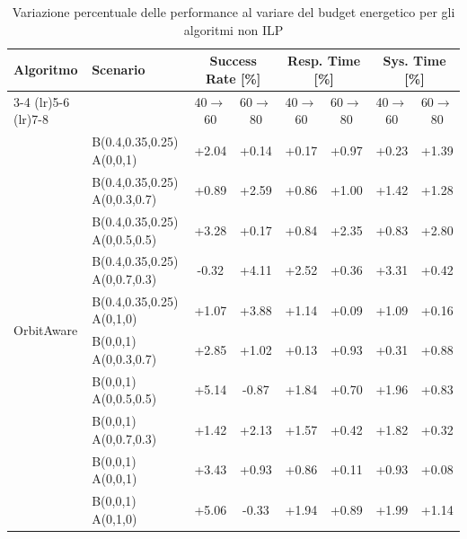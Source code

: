 \documentclass[12pt]{article}
\begin{document}
\begin{table}[h]
\centering
\caption{Variazione percentuale delle performance al variare del budget energetico per gli algoritmi non ILP}
\label{tab:all_algorithms_variation}
\scriptsize
\begin{tabular}{llcccccc}
\toprule
\textbf{Algoritmo} & \textbf{Scenario} 
& \multicolumn{2}{c}{\textbf{Success Rate [\%]}} 
& \multicolumn{2}{c}{\textbf{Resp. Time [\%]}} 
& \multicolumn{2}{c}{\textbf{Sys. Time [\%]}} \\
\cmidrule(lr){3-4} \cmidrule(lr){5-6} \cmidrule(lr){7-8}
& & 40$\rightarrow$60 & 60$\rightarrow$80 
& 40$\rightarrow$60 & 60$\rightarrow$80 
& 40$\rightarrow$60 & 60$\rightarrow$80 \\
\midrule

\multirow{10}{*}{OrbitAware}
& B(0.4,0.35,0.25) A(0,0,1)     & +2.04 & +0.14 & +0.17 & +0.97 & +0.23 & +1.39 \\
& B(0.4,0.35,0.25) A(0,0.3,0.7) & +0.89 & +2.59 & +0.86 & +1.00 & +1.42 & +1.28 \\
& B(0.4,0.35,0.25) A(0,0.5,0.5) & +3.28 & +0.17 & +0.84 & +2.35 & +0.83 & +2.80 \\
& B(0.4,0.35,0.25) A(0,0.7,0.3) & -0.32 & +4.11 & +2.52 & +0.36 & +3.31 & +0.42 \\
& B(0.4,0.35,0.25) A(0,1,0)     & +1.07 & +3.88 & +1.14 & +0.09 & +1.09 & +0.16 \\
& B(0,0,1) A(0,0.3,0.7)         & +2.85 & +1.02 & +0.13 & +0.93 & +0.31 & +0.88 \\
& B(0,0,1) A(0,0.5,0.5)         & +5.14 & -0.87 & +1.84 & +0.70 & +1.96 & +0.83 \\
& B(0,0,1) A(0,0.7,0.3)         & +1.42 & +2.13 & +1.57 & +0.42 & +1.82 & +0.32 \\
& B(0,0,1) A(0,0,1)             & +3.43 & +0.93 & +0.86 & +0.11 & +0.93 & +0.08 \\
& B(0,0,1) A(0,1,0)             & +5.06 & -0.33 & +1.94 & +0.89 & +1.99 & +1.14 \\

\midrule


\end{tabular}
\end{table}
\end{document}
